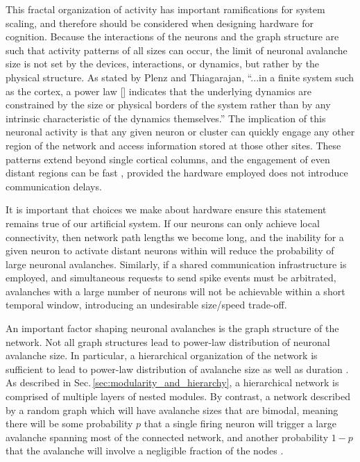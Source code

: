\documentclass[twocolumn]{article}
\begin{document}
This fractal organization of activity has important ramifications for system scaling, and therefore should be considered when designing hardware for cognition. Because the interactions of the neurons and the graph structure are such that activity patterns of all sizes can occur, the limit of neuronal avalanche size is not set by the devices, interactions, or dynamics, but rather by the physical structure. As stated by Plenz and Thiagarajan, ``...in a finite system such as the cortex, a power law [] indicates that the underlying dynamics are constrained by the size or physical borders of the system rather than by any intrinsic characteristic of the dynamics themselves.'' \cite{plth2006} The implication of this neuronal activity is that any given neuron or cluster can quickly engage any other region of the network and access information stored at those other sites. These patterns extend beyond single cortical columns, and the engagement of even distant regions can be fast \cite{plth2006}, provided the hardware employed does not introduce communication delays.

It is important that choices we make about hardware ensure this statement remains true of our artificial system. If our neurons can only achieve local connectivity, then network path lengths we become long, and the inability for a given neuron to activate distant neurons within will reduce the probability of large neuronal avalanches. Similarly, if a shared communication infrastructure is employed, and simultaneous requests to send spike events must be arbitrated, avalanches with a large number of neurons will not be achievable within a short temporal window, introducing an undesirable size/speed trade-off.

An important factor shaping neuronal avalanches is the graph structure of the network. Not all graph structures lead to power-law distribution of neuronal avalanche size. In particular, a hierarchical organization of the network is sufficient to lead to power-law distribution of avalanche size as well as duration \cite{frla2013}. As described in Sec.\,\ref{sec:modularity_and_hierarchy}, a hierarchical network is comprised of multiple layers of nested modules. By contrast, a network described by a random graph which will have avalanche sizes that are bimodal, meaning there will be some probability $p$ that a single firing neuron will trigger a large avalanche spanning most of the connected network, and another probability $1-p$ that the avalanche will involve a negligible fraction of the nodes \cite{frla2013}.
\end{document}
